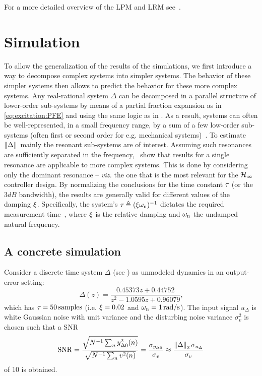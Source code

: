 For a more detailed overview of  the \gls{LPM} and \gls{LRM} see~\citep{Schoukens2009LPM,Pintelon2010LPM1,Pintelon2010LPM2,McKelvey2012LRM}.


\section{Simulation}
\label{sec:simulation}
To allow the generalization of the results of the simulations, we first introduce a way to decompose complex systems into simpler systems.
The behavior of these simpler systems then allows to predict the behavior for these more complex systems.
Any real-rational system $\Delta$ can be decomposed in a parallel structure of lower-order sub-systems by means of a partial fraction expansion as in \eqref{eq:excitation:PFE} and using the same logic as in .
As a result, systems can often be well-represented, in a small frequency range, by a sum of a few low-order sub-systems (often first or second order for e.g. mechanical systems)~\citep[Section 2.2.2]{Gawronski2004}.
To estimate $\left\| \Delta \right\|_{}$ mainly the resonant sub-systems are of interest.
Assuming such resonances are sufficiently separated in the frequency,~\citep{Schoukens2013LPMerror,Geerardyn2013TIM,Gawronski2004} show that results for a single resonance are applicable to more complex systems.
This is done by considering only the dominant resonance -- \emph{viz.} the one that is the most relevant for the $\mathcal{H}_{\infty}{}$ controller design.
By normalizing the conclusions for the time constant $\tau_{}$ (or the $3\unit{dB}$ bandwidth), the results are generally valid for different values of the damping $\xi_{}$.
Specifically, the system's $\tau_{} \triangleq (\xi_{} \omega_{\mathrm{n}})^{-1}$ dictates the required measurement time~\citep{Schoukens2013LPMerror}, where $\xi_{}$ is the relative damping and $\omega_{\mathrm{n}}$ the undamped natural frequency.

\subsection{A concrete simulation}
Consider a discrete time system $\Delta$ (see ) as unmodeled dynamics in an output-error setting:
\begin{equation}
  \Delta(z) 
    =  \frac{0.45373 z + 0.44752}
            {z^2 - 1.0595 z + 0.96079}
  \label{eq:O2sysDT}
  \text{,}
\end{equation}
which has $\tau_{} = 50 \,\mathrm{samples}$ (i.e. $\xi_{}=0.02$ and $\omega_{\mathrm{n}} = 1 \,\mathrm{rad/s}$).
The input signal $u_{\Delta}$ is white Gaussian noise with unit variance and the disturbing noise variance $\sigma_v^2$ is chosen such that a \gls{SNR} 
\begin{equation}
  \SNR = \frac{\sqrt{\inv{N}\sum_n y_{\Delta0}^2(n) }}%
              {\sqrt{\inv{N}\sum_n v^2(n) }}
       = \frac{\sigma_{y_{\Delta0}}}{\sigma_v}
       \approx \frac{\norm[2]{\Delta} \sigma_{u_{\Delta}}}{\sigma_v}
  \label{eq:SNR}
\end{equation}
of $10$ is obtained.

